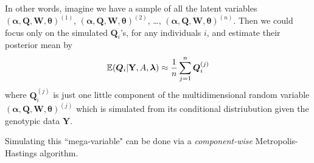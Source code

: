 In other words, imagine we have a sample of all the latent variables $(\bm{\alpha}, \bm{Q},\mathbf{W}, \bm{\theta})^{(1)}$, $(\bm{\alpha}, \bm{Q},\mathbf{W}, \bm{\theta})^{(2)}$, \ldots, $(\bm{\alpha}, \bm{Q},\mathbf{W}, \bm{\theta})^{(n)}$.  Then we could focus only on the simulated $\bm{Q}_i$'s, for any individuals $i$, and estimate their posterior mean by  
\[
	\Exp(\bm{Q}_i|\mathbf{Y},A,\bm{\lambda}) \approx \frac{1}{n}
	\sum_{j=1}^n \bm{Q}_i^{(j)}
\]
where $\bm{Q}_i^{(j)}$ is just one little component of the multidimensional random variable $(\bm{\alpha}, \bm{Q},\mathbf{W}, \bm{\theta})^{(j)}$ which is simulated from its conditional distriubution given the genotypic data $\mathbf{Y}$.

Simulating this ``mega-variable" can be done via a {\em component-wise} Metropolis-Hastings algorithm.

